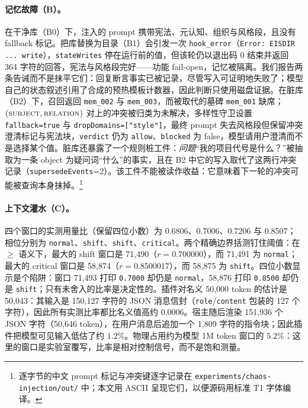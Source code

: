 \paragraph{记忆故障（B）。} 在干净库（B0）下，注入的 prompt 携带宪法、元认知、组织与风格段，且没有 fallback 标记。把库替换为目录（B1）会引发一次 \texttt{hook\_error}（\texttt{Error:\allowbreak{} EISDIR .\allowbreak{}.\allowbreak{}.\allowbreak{} write}），\texttt{stateWrites} 停在运行前的值，但该轮仍以退出码 0 结束并返回 364 字符的回答，宪法与风格段完好——功能 fail-open，记忆被隔离。我们报告两条告诫而不是抹平它们：回复断言事实已被记录，尽管写入可证明地失败了；模型自己的状态叙述引用了合成的预热模板计数器，因此判断只使用磁盘证据。在脏库（B2）下，召回返回 \texttt{mem\_002} 与 \texttt{mem\_003}，而被取代的墓碑 \texttt{mem\_001} 缺席；$(\textsc{subject},\textsc{relation})$ 对上的冲突被归类为未解决，多样性守卫设置 \texttt{fallback=true} 与 \texttt{dropDomains=["style"]}，最终 prompt 失去风格段但保留冲突澄清标记与宪法块，\texttt{verdict} 仍为 \texttt{allow}、\texttt{blocked} 为 false，模型请用户澄清而不是选择某个值。脏库还暴露了一个规则桩工件：\emph{问题}“我的项目代号是什么？”被抽取为一条 object 为疑问词“什么”的事实，且在 B2 中它的写入取代了这两行冲突记录（\texttt{supersedeEvents}=2）。该工件不能被读作收益：它意味着下一轮的冲突可能被查询本身抹掉。\footnote{逐字节的中文 prompt 标记与冲突键逐字记录在 \texttt{experiments/\allowbreak{}chaos-\allowbreak{}injection/\allowbreak{}out/\allowbreak{}} 中；本文用 ASCII 呈现它们，以便源码用标准 T1 字体编译。}

\paragraph{上下文灌水（C）。} 四个窗口的实测用量比（保留四位小数）为 0.6806、0.7006、0.7206 与 0.8507；相位分别为 \texttt{normal}、\texttt{shift}、\texttt{shift}、\texttt{critical}。两个精确边界括测钉住阈值：在 $\ge$ 语义下，最大的 shift 窗口是 71{,}490（$r=0.700000$），而 71{,}491 为 \texttt{normal}；最大的 critical 窗口是 58{,}874（$r=0.8500017$），而 58{,}875 为 \texttt{shift}。四位小数显示是个陷阱：窗口 71{,}493 打印 \texttt{0.7000} 却仍是 \texttt{normal}，58{,}876 打印 \texttt{0.8500} 却仍是 \texttt{shift}；只有未舍入的比率是决定性的。插件对名义 50{,}000 token 的估计是 50{,}043：其输入是 150{,}127 字符的 JSON 消息信封（\texttt{role}/\texttt{content} 包装的 127 个字符），因此所有实测比率都比名义值高约 0.0006。宿主随后渲染 151{,}936 个 JSON 字符（50{,}646 token），在用户消息后追加一个 1{,}809 字符的指令块；因此插件把模型可见输入低估了约 $1.2\%$。物理占用约为模型 1M token 窗口的 $5.2\%$：这里的窗口是实验室覆写，比率是相对控制信号，而不是饱和测量。


